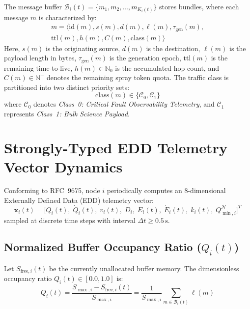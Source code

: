 \documentclass[journal,compsoc]{IEEEtran}
\begin{document}
The message buffer $\mathcal{B}_i(t) = \{m_1, m_2, \dots, m_{K_i(t)}\}$ stores bundles, where each message $m$ is characterized by:
\begin{multline}
m = \bigl\langle \mathrm{id}(m), s(m), d(m), \ell(m), \tau_{\mathrm{gen}}(m), \\
    \mathrm{ttl}(m), h(m), C(m), \mathrm{class}(m)\bigr\rangle
\end{multline}
Here, $s(m)$ is the originating source, $d(m)$ is the destination, $\ell(m)$ is the payload length in bytes, $\tau_{\mathrm{gen}}(m)$ is the generation epoch, $\mathrm{ttl}(m)$ is the remaining time-to-live, $h(m) \in \mathbb{N}_0$ is the accumulated hop count, and $C(m) \in \mathbb{N}^+$ denotes the remaining spray token quota. The traffic class is partitioned into two distinct priority sets:
\begin{equation}
\mathrm{class}(m) \in \{\mathcal{C}_0, \mathcal{C}_1\}
\end{equation}
where $\mathcal{C}_0$ denotes \emph{Class~0: Critical Fault Observability Telemetry}, and $\mathcal{C}_1$ represents \emph{Class~1: Bulk Science Payload}.

\section{Strongly-Typed EDD Telemetry Vector Dynamics}

Conforming to RFC~9675, node $i$ periodically computes an 8-dimensional Externally Defined Data (EDD) telemetry vector:
\begin{equation}
\mathbf{x}_i(t) = \bigl[ Q_i(t), \; \dot{Q}_i(t), \; v_i(t), \; D_i, \; E_i(t), \; \dot{E}_i(t), \; k_i(t), \; Q_{\min, i}^{\mathcal{N}} \bigr]^T
\end{equation}
sampled at discrete time steps with interval $\Delta t \ge 0.5\,\mathrm{s}$.

\subsection{Normalized Buffer Occupancy Ratio ($Q_i(t)$)}
Let $S_{\mathrm{free}, i}(t)$ be the currently unallocated buffer memory. The dimensionless occupancy ratio $Q_i(t) \in [0.0, 1.0]$ is:
\begin{equation}
Q_i(t) = \frac{S_{\max, i} - S_{\mathrm{free}, i}(t)}{S_{\max, i}} = \frac{1}{S_{\max, i}} \sum_{m \in \mathcal{B}_i(t)} \ell(m)
\end{equation}
\end{document}
